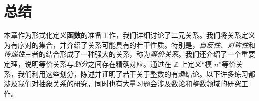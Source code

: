 \section{总结}

本章作为形式化定义\textbf{函数}的准备工作，我们详细讨论了二元关系。我们将关系定义为有序对的集合，并介绍了关系可能具有的若干性质。特别是，\emph{自反性}、\emph{对称性}和\emph{传递性}三者的结合形成了一种强大的关系，称为\emph{等价关系}。我们还介绍了一个重要定理，说明等价关系与\emph{划分}之间存在精确对应。通过在 $\mathbb{Z}$ 上定义``模 $n$''等价关系，我们利用这些划分，陈述并证明了若干关于整数的有趣结论。以下许多练习都涉及我们对抽象关系的研究，同时也有大量习题会涉及数论和整数领域的研究工作。